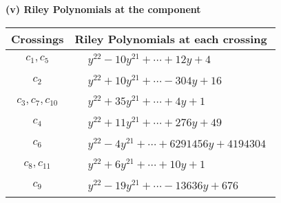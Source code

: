 \documentclass[1p]{elsarticle_modified}
\theoremstyle{definition}
\begin{document}
\newpage\renewcommand{\arraystretch}{1}
\flushleft \textbf{(v) Riley Polynomials at the component}\newline \\
\begin{tabular}{m{50pt}|m{274pt}}
Crossings & \hspace{64pt}Riley Polynomials at each crossing \\
\hline $$\begin{aligned}c_{1},c_{5}\end{aligned}$$&$\begin{aligned}
&y^{22}-10 y^{21}+\cdots+12 y+4
\end{aligned}$\\
\hline $$\begin{aligned}c_{2}\end{aligned}$$&$\begin{aligned}
&y^{22}+10 y^{21}+\cdots-304 y+16
\end{aligned}$\\
\hline $$\begin{aligned}c_{3},c_{7},c_{10}\end{aligned}$$&$\begin{aligned}
&y^{22}+35 y^{21}+\cdots+4 y+1
\end{aligned}$\\
\hline $$\begin{aligned}c_{4}\end{aligned}$$&$\begin{aligned}
&y^{22}+11 y^{21}+\cdots+276 y+49
\end{aligned}$\\
\hline $$\begin{aligned}c_{6}\end{aligned}$$&$\begin{aligned}
&y^{22}-4 y^{21}+\cdots+6291456 y+4194304
\end{aligned}$\\
\hline $$\begin{aligned}c_{8},c_{11}\end{aligned}$$&$\begin{aligned}
&y^{22}+6 y^{21}+\cdots+10 y+1
\end{aligned}$\\
\hline $$\begin{aligned}c_{9}\end{aligned}$$&$\begin{aligned}
&y^{22}-19 y^{21}+\cdots-13636 y+676
\end{aligned}$\\
\hline
\end{tabular}\\~\\
\end{document}
